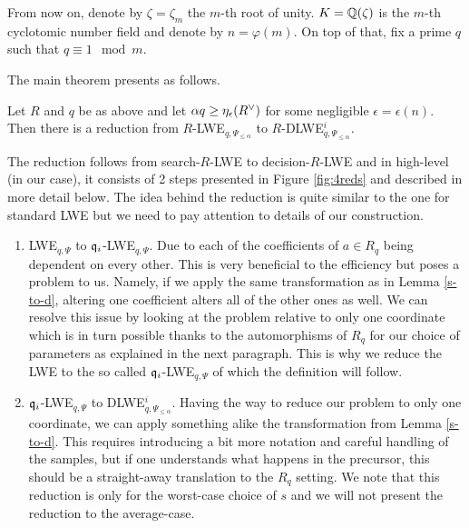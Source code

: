 From now on, denote by $\zeta = \zeta_m$ the $m$-th root of unity. $K = \mathbb{Q}(\zeta)$ is the $m$-th cyclotomic number field and denote by $n = \varphi(m)$. On top of that, fix a prime $q$ such that $q \equiv 1 \mod m$.

The main theorem presents as follows.
\begin{theorem}\label{d-to-s-rlwe}
	Let $R$ and $q$ be as above and let $\alpha q \geq \eta_{\epsilon}(R^{\vee})$ for some negligible $\epsilon = \epsilon(n)$. Then there is a reduction from $R$-LWE$_{q,\Psi_{\leq \alpha}}$ to $R$-DLWE$^i_{q,\Psi_{\leq \alpha}}$.
\end{theorem}
The reduction follows from search-$R$-LWE to decision-$R$-LWE and in high-level (in our case), it consists of 2 steps presented in Figure \ref{fig:4reds} and described in more detail below. The idea behind the reduction is quite similar to the one for standard LWE but we need to pay attention to details of our construction.
\begin{enumerate}
	\item LWE$_{q, \Psi}$ to $\mathfrak{q}_i$-LWE$_{q, \Psi}$. Due to each of the coefficients of $a \in R_q$ being dependent on every other. This is very beneficial to the efficiency but poses a problem to us. Namely, if we apply the same transformation as in Lemma \ref{s-to-d}, altering one coefficient alters all of the other ones as well. We can resolve this issue by looking at the problem relative to only one coordinate which is in turn possible thanks to the automorphisms of $R_q$ for our choice of parameters as explained in the next paragraph. This is why we reduce the LWE to the so called $\mathfrak{q}_i$-LWE$_{q, \Psi}$ of which the definition will follow.
	\item $\mathfrak{q}_i$-LWE$_{q,\Psi}$ to DLWE$^i_{q, \Psi_{\leq \alpha}}$. Having the way to reduce our problem to only one coordinate, we can apply something alike the transformation from Lemma \ref{s-to-d}. This requires introducing a bit more notation and careful handling of the samples, but if one understands what happens in the precursor, this should be a straight-away translation to the $R_q$ setting. We note that this reduction is only for the worst-case choice of $s$ and we will not present the reduction to the average-case.
\end{enumerate}

